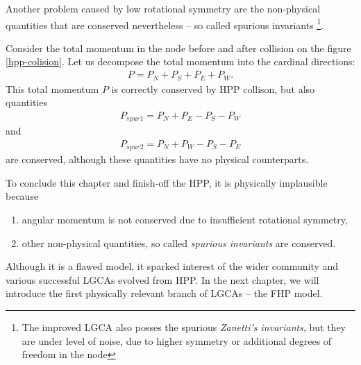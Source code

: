 \bigskip
Another problem caused by low rotational symmetry are the non-physical quantities that are conserved nevertheless -- so called spurious invariants \footnote{The improved LGCA also posses the spurious \textit{Zanetti's invariants}, but they are under level of noise, due to higher symmetry or additional degrees of freedom in the node}.

Consider the total momentum in the node before and after collision on the figure \ref{hpp-colision}.
Let us decompose the total momentum into the cardinal directions:
\begin{align} 
P = P_N + P_S + P_E + P_W.
\end{align}
This total momentum $P$ is correctly conserved by HPP collison, but also quantities
\begin{align} \label{zanet}
P_{spur1} = P_N + P_E - P_S - P_W
\end{align}
and
\begin{align}
P_{spur2} = P_N + P_W - P_S - P_E
\end{align}
are conserved, although these quantities have no physical counterparts.

\bigskip

To conclude this chapter and finish-off the HPP, it is physically implausible because
\begin{enumerate}
\item angular momentum is not conserved due to insufficient rotational symmetry,
\item other non-physical quantities, so called \textit{spurious invariants} are conserved.
\end{enumerate}

Although it is a flawed model, it sparked interest of the wider community and various successful LGCAs evolved from HPP. In the next chapter, we will introduce the first physically relevant branch of LGCAs -- the FHP model.